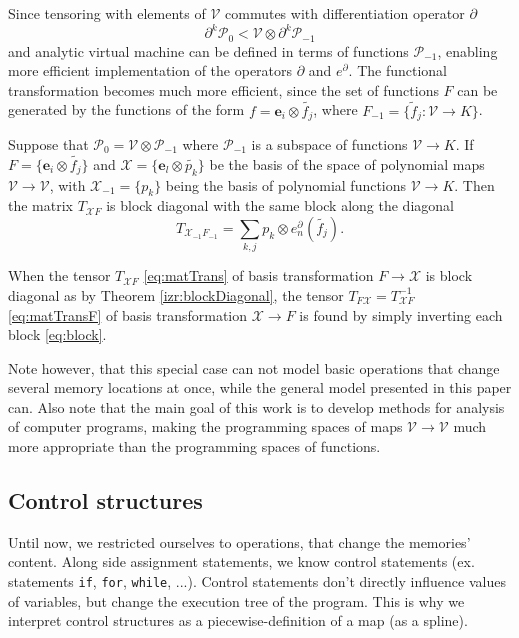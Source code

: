 \documentclass[smallcondensed]{svjour3}
\newcommand{\VV}{\mathcal{V}}
\newcommand{\e}{\mathbf{e}}
\newcommand{\X}{\mathcal{X}}
\newcommand{\dP}{\mathcal{P}}
\newcommand{\D}{\partial}
\begin{document}
Since tensoring with elements of $\VV$ commutes with differentiation operator $\D$
\begin{equation}
  \label{eq:dP0_dP-1}
  \D^k\dP_0 < \VV\otimes \D^k\dP_{-1}
\end{equation}
and analytic virtual machine can be defined in terms of functions $\dP_{-1}$,
enabling more efficient implementation of the operators $\D$ and $e^\D$. The
functional transformation becomes much more efficient, since the set of
functions $F$ can be generated by the functions of the form  $f=\e_i\otimes
\tilde{f_j}$, where $F_{-1}=\{\tilde{f}_j:\VV\to K \}$.
\begin{theorem}\label{izr:blockDiagonal}
Suppose that $\dP_0=\VV\otimes \dP_{-1}$ where $\dP_{-1}$ is a subspace of functions $\VV\to K$. If $F=\{\e_i\otimes \tilde{f_j}\}$ and $\X=\{\e_l\otimes \tilde{p_k}\}$ be the basis of the space of polynomial maps $\VV\to\VV$, with $\X_{-1}=\{p_k\}$ being the basis
of polynomial functions $\VV\to K$. Then the matrix $T_{\X F}$ is block diagonal with the same block along the diagonal
\begin{equation}
  \label{eq:block}
  T_{\X_{-1}F_{-1}} = \sum\limits_{k,j} p_k\otimes e^{\D}_n(\tilde{f_j}).
\end{equation}
\end{theorem}
\begin{corollary}
When the tensor $T_{\X F}$ \eqref{eq:matTrans} of basis transformation $F\to\X$ is block diagonal as by Theorem \ref{izr:blockDiagonal}, the tensor $T_{F\X}=T_{\X F}^{-1}$ \eqref{eq:matTransF} of basis transformation $\X\to F$ is found by simply inverting each block \eqref{eq:block}.
\end{corollary}
Note however, that this special case can not model basic operations that
change several memory locations at once, while the general model presented in this paper can. Also note that the main goal of this
work is to develop methods for analysis of computer programs, making the programming
spaces of maps $\VV\to \VV$ much more appropriate than the programming spaces of
functions.
 \subsection{Control structures}\label{sec:control}
 
 Until now, we restricted ourselves to operations, that change the memories' content. Along side assignment statements, we know control statements (ex. statements \texttt{if},
  \texttt{for}, \texttt{while}, ...). Control statements don't directly
  influence values of variables, but change the execution tree of the program. This is why
  we interpret control structures as a piecewise-definition of a map (as a spline).
  
\end{document}
